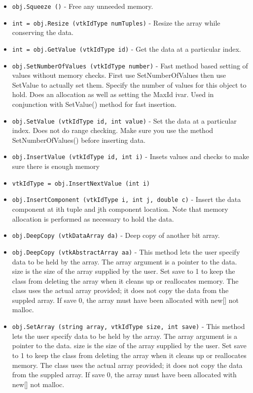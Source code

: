 \begin{itemize}
\item  \verb|obj.Squeeze ()| -  Free any unneeded memory.

\item  \verb|int = obj.Resize (vtkIdType numTuples)| -  Resize the array while conserving the data.

\item  \verb|int = obj.GetValue (vtkIdType id)| -  Get the data at a particular index.

\item  \verb|obj.SetNumberOfValues (vtkIdType number)| -  Fast method based setting of values without memory checks. First
 use SetNumberOfValues then use SetValue to actually set them.
 Specify the number of values for this object to hold. Does an
 allocation as well as setting the MaxId ivar. Used in conjunction with
 SetValue() method for fast insertion.

\item  \verb|obj.SetValue (vtkIdType id, int value)| -  Set the data at a particular index. Does not do range checking. Make sure
 you use the method SetNumberOfValues() before inserting data.

\item  \verb|obj.InsertValue (vtkIdType id, int i)| -  Insets values and checks to make sure there is enough memory

\item  \verb|vtkIdType = obj.InsertNextValue (int i)|

\item  \verb|obj.InsertComponent (vtkIdType i, int j, double c)| -  Insert the data component at ith tuple and jth component location. 
 Note that memory allocation is performed as necessary to hold the data.

\item  \verb|obj.DeepCopy (vtkDataArray da)| -  Deep copy of another bit array.

\item  \verb|obj.DeepCopy (vtkAbstractArray aa)| -  This method lets the user specify data to be held by the array.  The 
 array argument is a pointer to the data.  size is the size of 
 the array supplied by the user.  Set save to 1 to keep the class
 from deleting the array when it cleans up or reallocates memory.
 The class uses the actual array provided; it does not copy the data 
 from the suppled array. If save 0, the array must have been allocated
 with new[] not malloc.

\item  \verb|obj.SetArray (string array, vtkIdType size, int save)| -  This method lets the user specify data to be held by the array.  The 
 array argument is a pointer to the data.  size is the size of 
 the array supplied by the user.  Set save to 1 to keep the class
 from deleting the array when it cleans up or reallocates memory.
 The class uses the actual array provided; it does not copy the data 
 from the suppled array. If save 0, the array must have been allocated
 with new[] not malloc.


\end{itemize}
